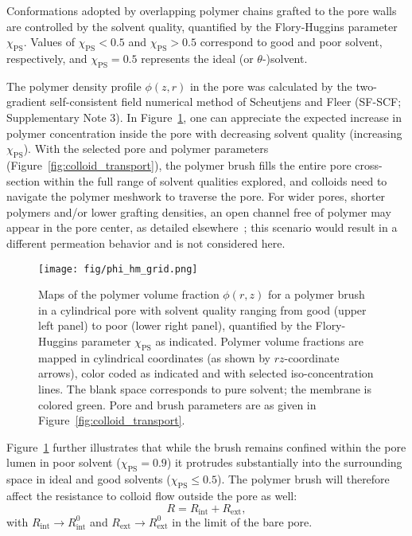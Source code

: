 \documentclass[12pt, a4paper]{article}
\begin{document}
Conformations adopted by overlapping polymer chains grafted to the pore walls are controlled by the solvent quality, quantified by the Flory-Huggins parameter $\chi_{\text{PS}}$.
Values of $\chi_{\text{PS}}<0.5$ and $\chi_{\text{PS}}>0.5$ correspond to good and poor solvent, respectively, and $\chi_{\text{PS}}=0.5$ represents the ideal (or $\theta$-)solvent.

The polymer density profile $\phi(z,r)$ in the pore was calculated by the two-gradient self-consistent field numerical method of Scheutjens and Fleer (SF-SCF; Supplementary Note 3).
In Figure~\ref{fig:phi_hm_grid}, one can appreciate the expected increase in polymer concentration inside the pore with decreasing solvent quality (increasing $\chi_{\text{PS}}$).
With the selected pore and polymer parameters (Figure~\ref{fig:colloid_transport}), the polymer brush fills the entire pore cross-section within the full range of solvent qualities explored, and colloids need to navigate the polymer meshwork to traverse the pore.
For wider pores, shorter polymers and/or lower grafting densities, an open channel free of polymer may appear in the pore center, as detailed elsewhere~\cite{Ligoure2001,Laktionov2021}; this scenario would result in a different permeation behavior and is not considered here.

\begin{figure}
    \centering
    \texttt{[image: fig/phi\_hm\_grid.png]}
    \caption{
    Maps of the polymer volume fraction $\phi(r,z)$ for a polymer brush in a cylindrical pore with solvent quality ranging from good (upper left panel) to poor (lower right panel), quantified by the Flory-Huggins parameter $\chi_{\text{PS}}$ as indicated.
    Polymer volume fractions are mapped in cylindrical coordinates (as shown by $rz$-coordinate arrows), color coded as indicated and with selected iso-concentration lines. The blank space corresponds to pure solvent; the membrane is colored green.
    Pore and brush parameters are as given in Figure~\ref{fig:colloid_transport}.
    }
    \label{fig:phi_hm_grid}
\end{figure}

Figure~\ref{fig:phi_hm_grid} further illustrates that while the brush remains confined within the pore lumen in poor solvent ($\chi_{\text{PS}}=0.9$) it protrudes substantially into the surrounding space in ideal and good solvents ($\chi_{\text{PS}}\le0.5$).
The polymer brush will therefore affect the resistance to colloid flow outside the pore as well:
\begin{equation}
    R=R_{\text{int}}+R_{\text{ext}},
    \label{eq:R_tot_tot}
\end{equation}
with $R_{\text{int}}\rightarrow R_{\text{int}}^{0}$ and $R_{\text{ext}}\rightarrow R_{\text{ext}}^{0}$ in the limit of the bare pore.
\end{document}
